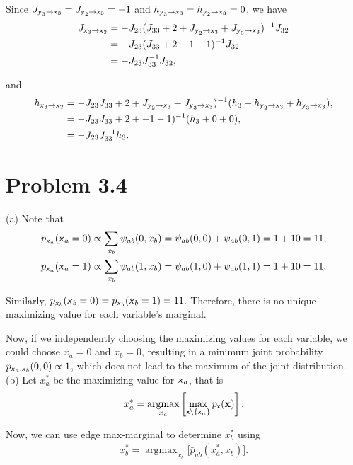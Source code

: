 \documentclass{article}
\newcommand{\s}[1]{\textsf{\textit{#1}}}
\newcommand{\bs}[1]{\textsf{\textbf{#1}}}
\newcommand{\qeds}{\hfill\qedsymbol}
\newcommand{\bm}{\mathbf}
\DeclareMathOperator*{\argmax}{argmax}
\begin{document}
Since $J_{\s{y}_3\to\s{x}_3} = J_{\s{y}_2\to\s{x}_3} = -1$
and $h_{\s{y}_3\to\s{x}_3} = h_{\s{y}_2\to\s{x}_3} = 0$, we have
\begin{align*}
	J_{\s{x}_3\to\s{x}_2} &= -J_{23}(J_{33} + 2 + 
	J_{\s{y}_2\to\s{x}_3} + J_{\s{y}_3\to\s{x}_3})^{-1}J_{32}\\
	& = -J_{23}(J_{33} + 2 -1 -1)^{-1}J_{32}\\
	& = -J_{23}J_{33}^{-1}J_{32},
\end{align*}

and
\begin{align*}
	h_{\s{x}_3\to\s{x}_2} &= -J_{23}J_{33} + 2 + 
	J_{\s{y}_2\to\s{x}_3} + J_{\s{y}_3\to\s{x}_3})^{-1}
	(h_3+h_{\s{y}_2\to\s{x}_3} + h_{\s{y}_3\to\s{x}_3}),\\
	&= -J_{23}J_{33} + 2 + 
	-1 -1)^{-1}
	(h_3+0 + 0),\\
	&=-J_{23}J_{33}^{-1}h_{3}.
\end{align*}
\pagebreak

\section*{Problem 3.4}
(a) Note that
\begin{align*}
	p_{\s{x}_a}(\s{x}_a = 0) &\propto \sum_{x_b}\psi_{ab}(0, x_b) = \psi_{ab}(0, 0) +  \psi_{ab}(0, 1) = 1 + 10 = 11,\\
	p_{\s{x}_a}(\s{x}_a = 1) &\propto \sum_{x_b}\psi_{ab}(1, x_b) = \psi_{ab}(1, 0) +  \psi_{ab}(1, 1) = 1 + 10 = 11.
\end{align*}

Similarly, $p_{\s{x}_b}(\s{x}_b = 0) = p_{\s{x}_b}(\s{x}_b = 1) = 11$. Therefore, there is no unique maximizing value for each variable's marginal.

Now, if we independently choosing the maximizing values for each variable, we could choose $x_a=0$ and $x_b=0$, resulting in a minimum joint probability $p_{\s{x}_a, \s{x}_b}(0,0) \propto 1$, which does not lead to the maximum of the joint distribution. \qeds
\\

\noindent
(b) Let $x_a^*$ be the maximizing value for $\s{x}_a$, that is
\begin{align*}
	x_a^* = \argmax_{x_a} \left[\max_{\bs{x}\backslash\{\s{x}_a\}}p_{\bs{x}}(\bm{x}) \right].
\end{align*}
%

Now, we can use edge max-marginal to determine $x_b^*$ using
\begin{align*}
	x_b^* = \argmax_{x_b} \bigg[\bar{p}_{ab}(x_a^*, x_b)\bigg].
\end{align*}
%
\end{document}
